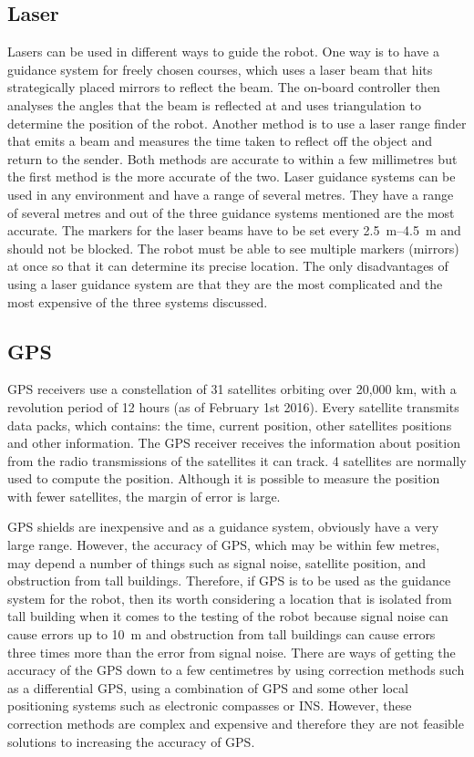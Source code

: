     \subsection{Laser}
        Lasers can be used in different ways to guide the robot. One way is to have a guidance system for freely chosen courses, which uses a laser beam that hits strategically placed mirrors to reflect the beam. The on-board controller then analyses the angles that the beam is reflected at and uses triangulation to determine the position of the robot. Another method is to use a laser range finder that emits a beam and measures the time taken to reflect off the object and return to the sender. Both methods are accurate to within a few millimetres but the first method is the more accurate of the two.
        Laser guidance systems can be used in any environment and have a range of several metres. They have a range of several metres and out of the three guidance systems mentioned are the most accurate. The markers for the laser beams have to be set every \SIrange{2.5}{4.5}{\meter} and should not be blocked. The robot must be able to see multiple markers (mirrors) at once so that it can determine its precise location. The only disadvantages of using a laser guidance system are that they are the most complicated and the most expensive of the three systems discussed.

    \subsection{GPS}
    \gls{GPS} receivers use a constellation of 31 satellites orbiting over 20,000 km, with a revolution period of 12 hours (as of February 1st 2016). Every satellite transmits data packs, which contains: the time, current position, other satellites positions and other information. The \gls{GPS} receiver receives the information about position from the radio transmissions of the satellites it can track. 4 satellites are normally used to compute the position. Although it is possible to measure the position with fewer satellites, the margin of error is large.

    \gls{GPS} \glspl{shield} are inexpensive and as a guidance system, obviously have a very large range.  However, the accuracy of \gls{GPS}, which may be within few metres, may depend a number of things such as signal noise, satellite position, and obstruction from tall buildings. Therefore, if GPS is to be used as the guidance system for the robot, then its worth considering a location that is isolated from tall building when it comes to the testing of the robot because signal noise can cause errors up to \SI{10}{\meter} and obstruction from tall buildings can cause errors three times more than the error from signal noise.\cite{gpsbasics} There are ways of getting the accuracy of the \gls{GPS} down to a few centimetres by using correction methods such as a differential \gls{GPS}, using a combination of \gls{GPS} and some other local positioning systems such as electronic compasses or \gls{INS}. However, these correction methods are complex and expensive and therefore they are not feasible solutions to increasing the accuracy of \gls{GPS}.



